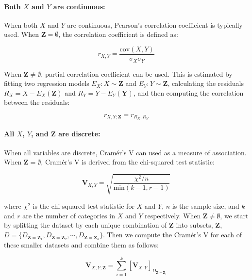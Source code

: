 \documentclass{uai2025} %
\begin{document}
\paragraph{Both $ X $ and $ Y $ are continuous: }
When both $ X $ and $ Y $ are continuous, Pearson's correlation coefficient is
typically used. When $ \bm{Z} = \emptyset $, the correlation
coefficient is defined as:

\begin{equation}
	r_{X, Y} = \frac{\mathrm{cov}(X, Y)}{\sigma_X \sigma_Y}
\end{equation}

When $ \bm{Z} \neq \emptyset $, partial correlation coefficient can be used.
This is estimated by fitting two regression models $ E_X: X \sim \bm{Z} $ and $
E_Y: Y \sim \bm{Z} $, calculating the residuals $ R_X = X - E_X(\bm{Z}) $ and $
R_Y = Y - E_Y(\bm{Y}) $, and then computing the correlation between the
residuals:

\begin{equation}
	r_{X, Y; \bm{Z}} = r_{R_X, R_Y}
\end{equation}

\paragraph{All $ X $, $ Y $, and $ \bm{Z} $ are discrete: }

When all variables are discrete, Cram\'er's V can used as a measure of
association. When $ \bm{Z} = \emptyset $, Cram\'er's V is derived from the 
chi-squared test statistic:

\begin{equation}
	\mathbf{V}_{X, Y} = \sqrt{\frac{\chi^2 / n}{\mathrm{min}(k-1, r-1)}}
\end{equation}

where $ \chi^2 $ is the chi-squared test statistic for $ X $ and $ Y $, $ n $
is the sample size, and $ k $ and $ r $ are the number of categories in $ X $
and $ Y $ respectively. When $ \bm{Z} \neq \emptyset $, we start by splitting
the dataset by each unique combination of $ \bm{Z} $ into subsets,  $ \bm{Z} $,
$ D = \{ D_{\bm{Z} = \bm{Z}_1}, D_{\bm{Z} = \bm{Z}_2}, \cdots, D_{\bm{Z} =
\bm{Z}_k} \} $. Then we compute the Cram\'er's V for each of these smaller datasets
and combine them as follows:

\begin{equation}
	\mathbf{V}_{X, Y; \bm{Z}} = \sum_{i=1}^{k} \left[ \mathbf{V}_{X, Y} \right]_{D_{\bm{Z} = \bm{Z}_i}} 
\end{equation}
\end{document}
